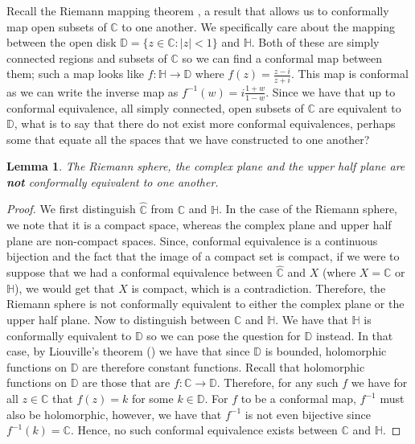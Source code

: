 \documentclass[11pt]{report}
\newtheorem{lemma}[thm]{Lemma}
\theoremstyle{definition}
\begin{document}
Recall the Riemann mapping theorem \cite[p.221]{ahlfors}, a result that allows us to conformally map open subsets of $\mathbb{C}$ to one another. We specifically care about the mapping between the open disk $\mathbb{D}=\{z \in \mathbb{C} \colon |z| < 1\}$ and $\mathbb{H}$. Both of these are simply connected regions and subsets of $\mathbb{C}$ so we can find a conformal map between them; such a map looks like $f:\mathbb{H} \rightarrow \mathbb{D}$ where $f(z) = \frac{z-i}{z+i}$. This map is conformal as we can write the inverse map as $f^{-1}(w) = i\frac{1+w}{1-w}$.
Since we have that up to conformal equivalence, all simply connected, open subsets of $\mathbb{C}$ are equivalent to $\mathbb{D}$, what is to say that there do not exist more conformal equivalences, perhaps some that equate all the spaces that we have constructed to one another? 
\begin{lemma}
  The Riemann sphere, the complex plane and the upper half plane are \textbf{not} conformally equivalent to one another.
\end{lemma}
\begin{proof}
  We first distinguish $\widehat{\mathbb{C}}$ from $\mathbb{C}$ and $\mathbb{H}$. In the case of the Riemann sphere, we note that it is a compact space, whereas the complex plane and upper half plane are non-compact spaces. Since, conformal equivalence is a continuous bijection and the fact that the image of a compact set is compact, if we were to suppose that we had a conformal equivalence between $\widehat{\mathbb{C}}$ and $X$ (where $X = \mathbb{C}$ or $\mathbb{H}$), we would get that $X$ is compact, which is a contradiction. Therefore, the Riemann sphere is not conformally equivalent to either the complex plane or the upper half plane. 
  Now to distinguish between $\mathbb{C}$ and $\mathbb{H}$. We have that $\mathbb{H}$ is conformally equivalent to $\mathbb{D}$ so we can pose the question for $\mathbb{D}$ instead. In that case, by Liouville's theorem (\cite[p.122]{ahlfors}) we have that since $\mathbb{D}$ is bounded, holomorphic functions on $\mathbb{D}$ are therefore constant functions. Recall that holomorphic functions on $\mathbb{D}$ are those that are $f\colon \mathbb{C} \rightarrow \mathbb{D}$. Therefore, for any such $f$ we have for all $z \in \mathbb{C}$ that $f(z) = k$ for some $k \in \mathbb{D}$. For $f$ to be a conformal map, $f^{-1}$ must also be holomorphic, however, we have that $f^{-1}$ is not even bijective since $f^{-1}(k) = \mathbb{C}$. Hence, no such conformal equivalence exists between $\mathbb{C}$ and $\mathbb{H}$. 
\end{proof}
\end{document}
